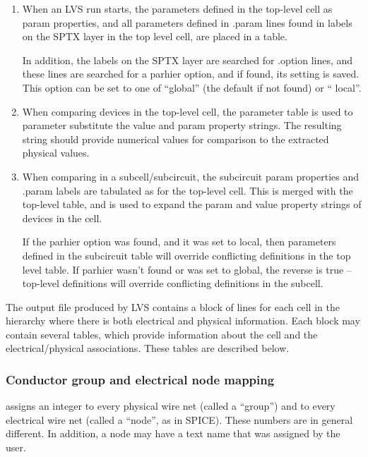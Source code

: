 \begin{enumerate}
\item{When an LVS run starts, the parameters defined in the top-level
cell as {\et param} properties, and all parameters defined in {\vt
.param} lines found in labels on the SPTX layer in the top level
cell, are placed in a table.

In addition, the labels on the SPTX layer are searched for {\vt
.option} lines, and these lines are searched for a {\et parhier}
option, and if found, its setting is saved.  This option can be set
to one of ``{\vt global}'' (the default if not found) or ``{\vt
local}''.}

\item{When comparing devices in the top-level cell, the parameter
table is used to parameter substitute the {\et value} and {\et param}
property strings.  The resulting string should provide numerical
values for comparison to the extracted physical values.}

\item{When comparing in a subcell/subcircuit, the subcircuit {\et
param} properties and {\vt .param} labels are tabulated as for the
top-level cell.  This is merged with the top-level table, and is used
to expand the {\et param} and {\et value} property strings of devices
in the cell.

If the {\vt parhier} option was found, and it was set to {\vt local},
then parameters defined in the subcircuit table will override
conflicting definitions in the top level table.  If {\vt parhier}
wasn't found or was set to {\vt global}, the reverse is true --
top-level definitions will override conflicting definitions in the
subcell.}
\end{enumerate}

The output file produced by LVS contains a block of lines for each
cell in the hierarchy where there is both electrical and physical
information.  Each block may contain several tables, which provide
information about the cell and the electrical/physical associations. 
These tables are described below.

\subsubsection{Conductor group and electrical node mapping}

{\Xic} assigns an integer to every physical wire net (called a
``group'') and to every electrical wire net (called a ``node'', as in
SPICE).  These numbers are in general different.  In addition, a node
may have a text name that was assigned by the user.

